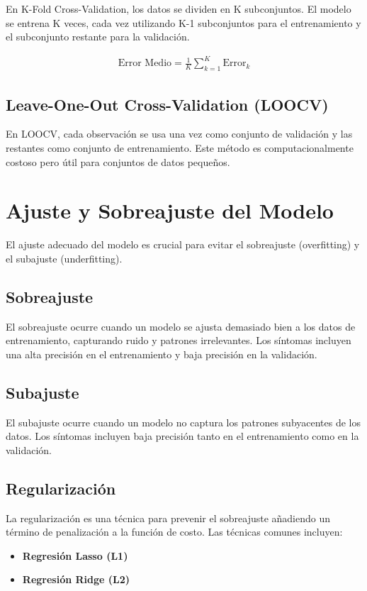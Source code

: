 En K-Fold Cross-Validation, los datos se dividen en K subconjuntos. El modelo se entrena K veces, cada vez utilizando K-1 subconjuntos para el entrenamiento y el subconjunto restante para la validación.

\begin{eqnarray*}
\text{Error Medio} = \frac{1}{K} \sum_{k=1}^{K} \text{Error}_k
\end{eqnarray*}

\subsection{Leave-One-Out Cross-Validation (LOOCV)}

En LOOCV, cada observación se usa una vez como conjunto de validación y las restantes como conjunto de entrenamiento. Este método es computacionalmente costoso pero útil para conjuntos de datos pequeños.

\section{Ajuste y Sobreajuste del Modelo}

El ajuste adecuado del modelo es crucial para evitar el sobreajuste (overfitting) y el subajuste (underfitting).

\subsection{Sobreajuste}

El sobreajuste ocurre cuando un modelo se ajusta demasiado bien a los datos de entrenamiento, capturando ruido y patrones irrelevantes. Los síntomas incluyen una alta precisión en el entrenamiento y baja precisión en la validación.

\subsection{Subajuste}

El subajuste ocurre cuando un modelo no captura los patrones subyacentes de los datos. Los síntomas incluyen baja precisión tanto en el entrenamiento como en la validación.

\subsection{Regularización}

La regularización es una técnica para prevenir el sobreajuste añadiendo un término de penalización a la función de costo. Las técnicas comunes incluyen:
\begin{itemize}
    \item \textbf{Regresión Lasso (L1)}
    \item \textbf{Regresión Ridge (L2)}
\end{itemize}

